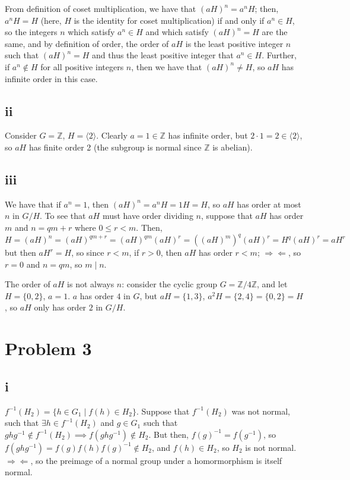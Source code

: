 \documentclass[12pt,letterpaper]{article}
\theoremstyle{definition}
\newcommand{\contra}{\Rightarrow\!\Leftarrow}
\newcommand{\Z}{\mathbb{Z}}
\begin{document}
From definition of coset multiplication, we have that $(aH)^{n} = a^{n}H$; then, $a^{n}H = H$ (here, $H$ is the identity for coset multiplication) if and only if $a^{n} \in H$, so the integers $n$ which satisfy $a^{n} \in H$ and which satisfy $(aH)^{n} = H$ are the same, and by definition of order, the order of $aH$ is the least positive integer $n$ such that $(aH)^{n} = H$ and thus the least positive integer that $a^{n} \in H$. Further, if $a^{n} \notin H$ for all positive integers $n$, then we have that $(aH)^{n} \neq H$, so $aH$ has infinite order in this case.

\subsection*{ii}

Consider $G = \Z$, $H = \langle 2 \rangle$. Clearly $a = 1 \in \Z$ has infinite order, but $2 \cdot 1 = 2 \in \langle 2 \rangle$, so $aH$ has finite order 2 (the subgroup is normal since $\Z$ is abelian).

\subsection*{iii}

We have that if $a^{n} = 1$, then $(aH)^{n} = a^{n}H = 1H = H$, so $aH$ has order at most $n$ in $G/H$. To see that $aH$ must have order dividing $n$, suppose that $aH$ has order $m$ and $n = qm + r$ where $0 \leq r < m$. Then,
\[
  H = (aH)^{n} = (aH)^{qm + r} = (aH)^{qm}(aH)^{r} = ((aH)^{m})^{q}(aH)^{r} = H^{q}(aH)^{r} = aH^{r}
\]
but then $aH^{r} = H$, so since $r < m$, if $r > 0$, then $aH$ has order $r < m$; $\contra$, so $r = 0$ and $n = qm$, so $m \mid n$.

The order of $aH$ is not always $n$: consider the cyclic group $G = \Z/4\Z$, and let $H = \{0, 2\}$, $a = 1$. $a$ has order $4$ in $G$, but $aH = \{1, 3\}$, $a^{2}H = \{2,4\} = \{0, 2\} = H$, so $aH$ only has order $2$ in $G/H$.

\section*{Problem 3}

\subsection*{i}

$f^{-1}(H_{2}) = \{h \in G_{1} \mid f(h) \in H_{2}\}$. Suppose that $f^{-1}(H_{2})$ was not normal, such that $\exists h \in f^{-1}(H_{2})$ and $g \in G_{1}$ such that $ghg^{-1} \notin f^{-1}(H_{2}) \implies f(ghg^{-1}) \notin H_{2}$. But then, $f(g)^{-1} = f(g^{-1})$, so $f(ghg^{-1}) = f(g)f(h)f(g)^{-1} \notin H_{2}$, and $f(h) \in H_{2}$, so $H_{2}$ is not normal. $\contra$, so the preimage of a normal group under a homormorphism is itself normal.
\end{document}

